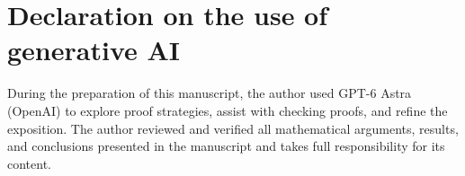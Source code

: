 \documentclass[10pt,a4paper]{article}
\numberwithin{equation}{section}
\theoremstyle{definition}
\theoremstyle{plain}
\begin{document}

\section*{Declaration on the use of generative AI}
During the preparation of this manuscript, the author used GPT-6 Astra
(OpenAI) to explore proof strategies, assist with checking proofs, and
refine the exposition. The author reviewed and verified all mathematical
arguments, results, and conclusions presented in the manuscript and
takes full responsibility for its content.
\end{document}
